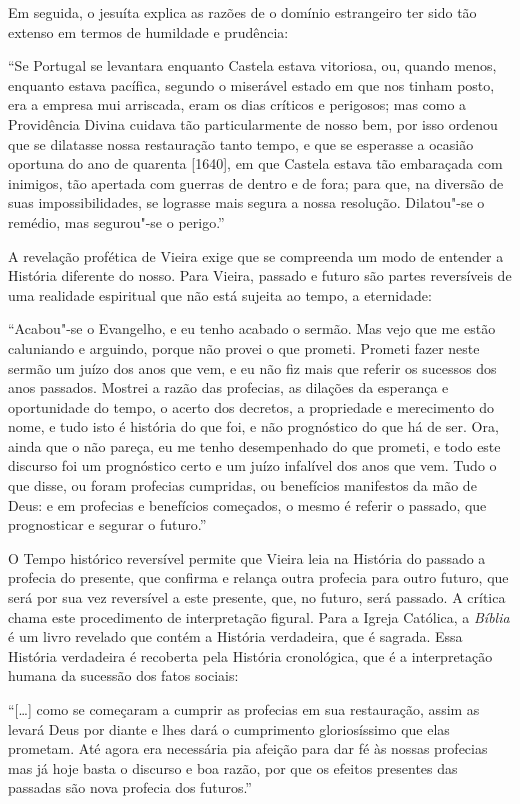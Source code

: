 Em seguida, o jesuíta explica as razões de o domínio estrangeiro ter
sido tão extenso em termos de humildade e prudência:

``Se Portugal se levantara enquanto Castela estava vitoriosa, ou, quando
menos, enquanto estava pacífica, segundo o miserável estado em que nos
tinham posto, era a empresa mui arriscada, eram os dias críticos e
perigosos; mas como a Providência Divina cuidava tão particularmente de
nosso bem, por isso ordenou que se dilatasse nossa restauração tanto
tempo, e que se esperasse a ocasião oportuna do ano de quarenta
{[}1640{]}, em que Castela estava tão embaraçada com inimigos, tão
apertada com guerras de dentro e de fora; para que, na diversão de suas
impossibilidades, se lograsse mais segura a nossa resolução. Dilatou"-se
o remédio, mas segurou"-se o perigo.''

A revelação profética de Vieira exige que se compreenda um modo de
entender a História diferente do nosso. Para Vieira, passado e futuro
são partes reversíveis de uma realidade espiritual que não está sujeita
ao tempo, a eternidade:

``Acabou"-se o Evangelho, e eu tenho acabado o sermão. Mas vejo que me
estão caluniando e arguindo, porque não provei o que prometi. Prometi
fazer neste sermão um juízo dos anos que vem, e eu não fiz mais que
referir os sucessos dos anos passados. Mostrei a razão das profecias, as
dilações da esperança e oportunidade do tempo, o acerto dos decretos, a
propriedade e merecimento do nome, e tudo isto é história do que foi, e
não prognóstico do que há de ser. Ora, ainda que o não pareça, eu me
tenho desempenhado do que prometi, e todo este discurso foi um
prognóstico certo e um juízo infalível dos anos que vem. Tudo o que
disse, ou foram profecias cumpridas, ou benefícios manifestos da mão de
Deus: e em profecias e benefícios começados, o mesmo é referir o
passado, que prognosticar e segurar o futuro.''

O Tempo histórico reversível permite que Vieira leia na História do
passado a profecia do presente, que confirma e relança outra profecia
para outro futuro, que será por sua vez reversível a este presente, que,
no futuro, será passado. A crítica chama este procedimento de
interpretação figural. Para a Igreja Católica, a \emph{Bíblia} é um
livro revelado que contém a História verdadeira, que é sagrada. Essa
História verdadeira é recoberta pela História cronológica, que é a
interpretação humana da sucessão dos fatos sociais:

``{[}\ldots{}{]} como se começaram a cumprir as profecias em sua restauração,
assim as levará Deus por diante e lhes dará o cumprimento gloriosíssimo
que elas prometam. Até agora era necessária pia afeição para dar fé às
nossas profecias mas já hoje basta o discurso e boa razão, por que os
efeitos presentes das passadas são nova profecia dos futuros.''

